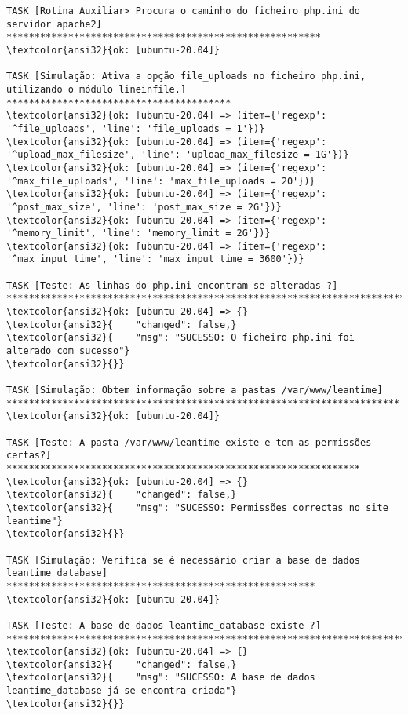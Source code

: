 \documentclass{scrartcl}
\begin{document}
\begin{Verbatim}
TASK [Rotina Auxiliar> Procura o caminho do ficheiro php.ini do servidor apache2] ********************************************************
\textcolor{ansi32}{ok: [ubuntu-20.04]}

TASK [Simulação: Ativa a opção file_uploads no ficheiro php.ini, utilizando o módulo lineinfile.] ****************************************
\textcolor{ansi32}{ok: [ubuntu-20.04] => (item={'regexp': '^file_uploads', 'line': 'file_uploads = 1'})}
\textcolor{ansi32}{ok: [ubuntu-20.04] => (item={'regexp': '^upload_max_filesize', 'line': 'upload_max_filesize = 1G'})}
\textcolor{ansi32}{ok: [ubuntu-20.04] => (item={'regexp': '^max_file_uploads', 'line': 'max_file_uploads = 20'})}
\textcolor{ansi32}{ok: [ubuntu-20.04] => (item={'regexp': '^post_max_size', 'line': 'post_max_size = 2G'})}
\textcolor{ansi32}{ok: [ubuntu-20.04] => (item={'regexp': '^memory_limit', 'line': 'memory_limit = 2G'})}
\textcolor{ansi32}{ok: [ubuntu-20.04] => (item={'regexp': '^max_input_time', 'line': 'max_input_time = 3600'})}

TASK [Teste: As linhas do php.ini encontram-se alteradas ?] ******************************************************************************
\textcolor{ansi32}{ok: [ubuntu-20.04] => {}
\textcolor{ansi32}{    "changed": false,}
\textcolor{ansi32}{    "msg": "SUCESSO: O ficheiro php.ini foi alterado com sucesso"}
\textcolor{ansi32}{}}

TASK [Simulação: Obtem informação sobre a pastas /var/www/leantime] **********************************************************************
\textcolor{ansi32}{ok: [ubuntu-20.04]}

TASK [Teste: A pasta /var/www/leantime existe e tem as permissões certas?] ***************************************************************
\textcolor{ansi32}{ok: [ubuntu-20.04] => {}
\textcolor{ansi32}{    "changed": false,}
\textcolor{ansi32}{    "msg": "SUCESSO: Permissões correctas no site leantime"}
\textcolor{ansi32}{}}

TASK [Simulação: Verifica se é necessário criar a base de dados leantime_database] *******************************************************
\textcolor{ansi32}{ok: [ubuntu-20.04]}

TASK [Teste: A base de dados leantime_database existe ?] *********************************************************************************
\textcolor{ansi32}{ok: [ubuntu-20.04] => {}
\textcolor{ansi32}{    "changed": false,}
\textcolor{ansi32}{    "msg": "SUCESSO: A base de dados leantime_database já se encontra criada"}
\textcolor{ansi32}{}}


\end{Verbatim}
\end{document}
